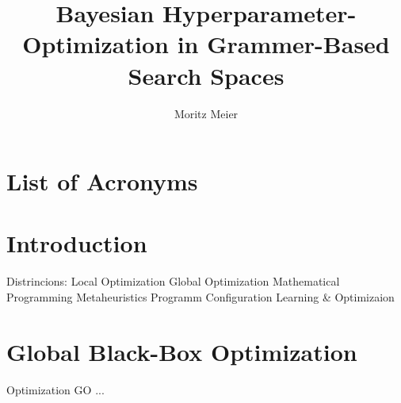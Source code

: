 \documentclass[english]{article}
\begin{document}
\title{Bayesian Hyperparameter-Optimization in Grammer-Based Search Spaces}
\author{Moritz Meier}
\maketitle
\tableofcontents
\newpage

\section*{List of Acronyms}
\begin{acronym}
\end{acronym}

\section{Introduction}
Distrincions:
Local Optimization
Global Optimization
Mathematical Programming
Metaheuristics
Programm Configuration
Learning & Optimizaion

\section{Global Black-Box Optimization}

Optimization \ac{GO} ...
\end{document}
